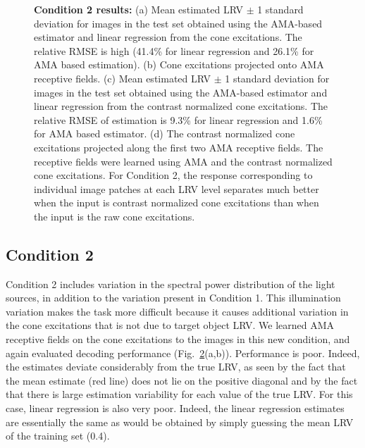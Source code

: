 \documentclass{jov}
\begin{document}
\begin{figure}
\begin{subfigure}[b]{0.22 \textwidth}
        \label{fig:case2RFResponseContrast}
    \end{subfigure}
    \caption{{\bf Condition 2 results:} (a) Mean estimated LRV $\pm$ 1 standard deviation for images in the test set obtained using the AMA-based estimator and linear regression from the cone excitations. The relative RMSE is high (41.4\% for linear regression and 26.1\% for AMA based estimation). (b) Cone excitations projected onto AMA receptive fields. (c) Mean estimated LRV $\pm$ 1 standard deviation for images in the test set obtained using the AMA-based estimator and linear regression from the contrast normalized cone excitations. The relative RMSE of estimation is 9.3\% for linear regression and 1.6\% for AMA based estimator. (d) The contrast normalized cone excitations projected along the first two AMA receptive fields. The receptive fields were learned using AMA and the contrast normalized cone excitations. For Condition 2, the response corresponding to individual image patches at each LRV level separates much better when the input is contrast normalized cone excitations than when the input is the raw cone excitations.}
\label{fig:Condition2}
\end{figure}

\subsection{Condition 2}

Condition 2 includes variation in the spectral power distribution of the light sources, in addition to the variation present in Condition 1. 
This illumination variation makes the task more difficult because it causes additional variation in the cone excitations that is not due to target object LRV. 
We learned AMA receptive fields on the cone excitations to the images in this new condition, and again evaluated decoding performance (Fig.~\ref{fig:Condition2}(a,b)). 
Performance is poor.
Indeed, the estimates deviate considerably from the true LRV, as seen by the fact that the mean estimate
(red line) does not lie on the positive diagonal and by the fact that there is large estimation variability for each
value of the true LRV.
For this case, linear regression is also very poor. Indeed, the linear regression estimates are essentially the same as would be obtained
by simply guessing the mean LRV of the training set (0.4).
\end{document}
